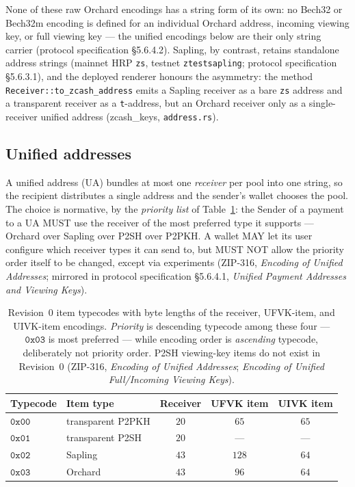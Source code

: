 \documentclass[11pt,a4paper]{article}
\theoremstyle{definition}
\begin{document}
None of these raw Orchard encodings has a string form of its own: no
Bech32 or Bech32m encoding is defined for an individual Orchard address,
incoming viewing key, or full viewing key --- the unified encodings below
are their only string carrier (protocol specification \S5.6.4.2). Sapling,
by contrast, retains standalone address strings (mainnet HRP \texttt{zs},
testnet \texttt{ztestsapling}; protocol specification \S5.6.3.1), and the
deployed renderer honours the asymmetry: the method
\texttt{Receiver::to\_zcash\_address} emits a Sapling receiver as a bare
\texttt{zs} address and a transparent receiver as a \texttt{t}-address,
but an Orchard receiver only as a single-receiver unified address
(\textsf{zcash\_keys}, \texttt{address.rs}).

\subsection{Unified addresses}\label{sec:addresses-ua}

A unified address (UA) bundles at most one \emph{receiver} per pool into
one string, so the recipient distributes a single address and the sender's
wallet chooses the pool. The choice is normative, by the \emph{priority
list} of Table~\ref{tab:typecodes}: the Sender of a payment to a UA MUST
use the receiver of the most preferred type it supports --- Orchard over
Sapling over P2SH over P2PKH. A wallet MAY let its user configure which
receiver types it can send to, but MUST NOT allow the priority order
itself to be changed, except via experiments (ZIP-316, \emph{Encoding of
Unified Addresses}; mirrored in protocol specification \S5.6.4.1,
\emph{Unified Payment Addresses and Viewing Keys}).

\begin{table}[htbp]
\centering
\begin{tabular}{llccc}
\toprule
Typecode & Item type & Receiver & UFVK item & UIVK item \\
\midrule
$\mathtt{0x00}$ & transparent P2PKH & $20$ & $65$ & $65$ \\
$\mathtt{0x01}$ & transparent P2SH  & $20$ & ---  & ---  \\
$\mathtt{0x02}$ & Sapling           & $43$ & $128$ & $64$ \\
$\mathtt{0x03}$ & Orchard           & $43$ & $96$  & $64$ \\
\bottomrule
\end{tabular}
\caption{Revision~0 item typecodes with byte lengths of the receiver,
UFVK-item, and UIVK-item encodings. \emph{Priority} is descending typecode
among these four --- $\mathtt{0x03}$ is most preferred --- while encoding
order is \emph{ascending} typecode, deliberately not priority order. P2SH
viewing-key items do not exist in Revision~0 (ZIP-316, \emph{Encoding of
Unified Addresses}; \emph{Encoding of Unified Full/Incoming Viewing
Keys}).}
\label{tab:typecodes}
\end{table}
\end{document}
